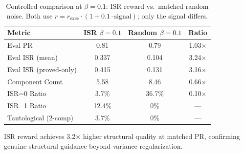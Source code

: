 \begin{table}[t]
\centering
\caption{Controlled comparison at $\beta{=}0.1$: ISR reward vs.\ matched random noise. Both use $r = r_\text{exec} \cdot (1 + 0.1 \cdot \text{signal})$; only the signal differs.}
\label{tab:beta01-comparison}
\begin{tabular}{lccc}
\toprule
\textbf{Metric} & \textbf{ISR $\beta{=}0.1$} & \textbf{Random $\beta{=}0.1$} & \textbf{Ratio} \\
\midrule
Eval PR & 0.81 & 0.79 & 1.03$\times$ \\
Eval ISR (mean) & 0.337 & 0.104 & 3.24$\times$ \\
Eval ISR (proved-only) & 0.415 & 0.131 & 3.16$\times$ \\
Component Count & 5.58 & 8.46 & 0.66$\times$ \\
ISR{=}0 Ratio & 3.7\% & 36.7\% & 0.10$\times$ \\
ISR{=}1 Ratio & 12.4\% & 0\% & --- \\
Tautological (2-comp) & 3.7\% & 0\% & --- \\
\bottomrule
\end{tabular}
\vspace{2pt}
\begin{minipage}{\columnwidth}
\footnotesize
ISR reward achieves 3.2$\times$ higher structural quality at matched PR, confirming genuine structural guidance beyond variance regularization.
\end{minipage}
\end{table}
